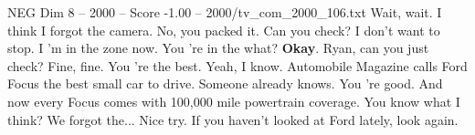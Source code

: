 \begin{textsample}{NEG Dim 8 – 2000 – Score -1.00 – 2000/tv\_com\_2000\_106.txt}  \label{ex:f8_neg_065}
Wait, wait.
I think I forgot the camera.
No, you packed it.
Can you check?
I don't want to stop.
I 'm in the zone now.
You 're in the what? \textbf{Okay}.
Ryan, can you just check?
Fine, fine.
You 're the best.
Yeah, I know.
Automobile Magazine calls Ford Focus the best small car to drive.
Someone already knows.
You 're good.
And now every Focus comes with 100,000 mile powertrain coverage.
You know what I think?
We forgot the...
Nice try.
If you haven't looked at Ford lately, look again.

\end{textsample}
